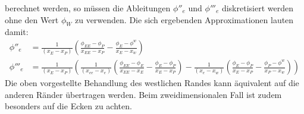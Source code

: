 berechnet werden, so müssen die Ableitungen $\phi''_e$ und $\phi'''_e$ diskretisiert werden ohne den Wert
$\phi_W$ zu verwenden. Die sich ergebenden Approximationen lauten damit:
\begin{align*}
  \phi''_e &= \frac{1}{(x_E-x_P)}\left({
\frac{\phi_{EE}-\phi_P}{x_{EE}-x_P}-\frac{\phi_E-\phi^w}{x_E-x_w}}\right)\\
\phi'''_e &= \frac{1}{(x_E-x_P)}\left({
\frac{1}{(x_{ee}-x_e)}
\left({\frac{\phi_{EE}-\phi_E}{x_{EE}-x_E}-\frac{\phi_E-\phi_P}{x_E-x_P} }\right)
-\frac{1}{(x_e-x_w)}
\left({\frac{\phi_E-\phi_P}{x_E-x_P} - \frac{\phi_P-\phi^w}{x_P-x_w}  }\right)
}\right)
\end{align*}
Die oben vorgestellte Behandlung des westlichen Randes kann äquivalent auf die anderen Ränder übertragen werden.
Beim zweidimensionalen Fall ist zudem besonders auf die Ecken zu achten.









